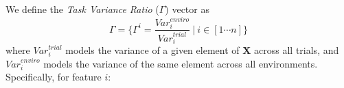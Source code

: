 
We define the {\em Task Variance Ratio} ($\Gamma$) vector as
\begin{equation} \Gamma = \{\Gamma^i=\frac{\mathit{Var}_i^{enviro}}{\mathit{Var}_i^{trial}}~\lvert~i\in[1\cdots n] \} \end{equation}
where $\mathit{Var}_i^{trial}$ models the variance of a given element of $\mathbf{X}$ across all trials, 
and $\mathit{Var}_i^{enviro}$ models the variance of the same element across all environments. 
Specifically, for feature $i$:


